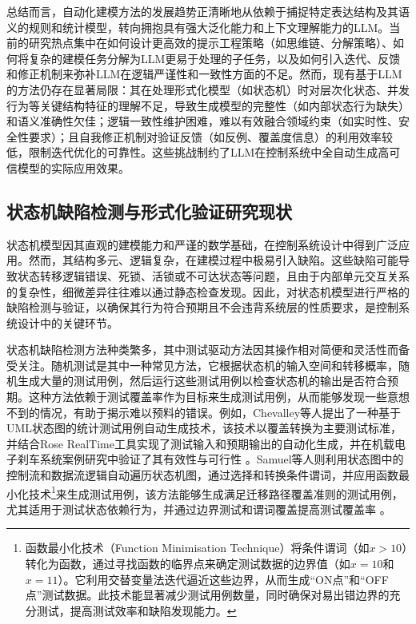 总结而言，自动化建模方法的发展趋势正清晰地从依赖于捕捉特定表达结构及其语义的规则和统计模型，转向拥抱具有强大泛化能力和上下文理解能力的LLM。当前的研究热点集中在如何设计更高效的提示工程策略（如思维链、分解策略）、如何将复杂的建模任务分解为LLM更易于处理的子任务，以及如何引入迭代、反馈和修正机制来弥补LLM在逻辑严谨性和一致性方面的不足。然而，现有基于LLM的方法仍存在显著局限：其在处理形式化模型（如状态机）时对层次化状态、并发行为等关键结构特征的理解不足，导致生成模型的完整性（如内部状态行为缺失）和语义准确性欠佳；逻辑一致性维护困难，难以有效融合领域约束（如实时性、安全性要求）；且自我修正机制对验证反馈（如反例、覆盖度信息）的利用效率较低，限制迭代优化的可靠性。这些挑战制约了LLM在控制系统中全自动生成高可信模型的实际应用效果。




\subsection{状态机缺陷检测与形式化验证研究现状}

状态机模型因其直观的建模能力和严谨的数学基础，在控制系统设计中得到广泛应用。然而，其结构多元、逻辑复杂，在建模过程中极易引入缺陷。这些缺陷可能导致状态转移逻辑错误、死锁、活锁或不可达状态等问题，且由于内部单元交互关系的复杂性，细微差异往往难以通过静态检查发现。因此，对状态机模型进行严格的缺陷检测与验证，以确保其行为符合预期且不会违背系统层的性质要求，是控制系统设计中的关键环节。

状态机缺陷检测方法种类繁多，其中测试驱动方法因其操作相对简便和灵活性而备受关注。随机测试是其中一种常见方法，它根据状态机的输入空间和转移概率，随机生成大量的测试用例，然后运行这些测试用例以检查状态机的输出是否符合预期。这种方法依赖于测试覆盖率作为目标来生成测试用例，从而能够发现一些意想不到的情况，有助于揭示难以预料的错误。例如，Chevalley等人提出了一种基于UML状态图的统计测试用例自动生成技术，该技术以覆盖转换为主要测试标准，并结合Rose RealTime工具实现了测试输入和预期输出的自动化生成，并在机载电子刹车系统案例研究中验证了其有效性与可行性 。Samuel等人则利用状态图中的控制流和数据流逻辑自动遍历状态机图，通过选择和转换条件谓词，并应用函数最小化技术\footnote{函数最小化技术（Function Minimisation Technique）将条件谓词（如$x > 10$）转化为函数，通过寻找函数的临界点来确定测试数据的边界值（如$x=10$和$x=11$）。它利用交替变量法迭代逼近这些边界，从而生成“ON点”和“OFF点”测试数据。此技术能显著减少测试用例数量，同时确保对易出错边界的充分测试，提高测试效率和缺陷发现能力。}来生成测试用例，该方法能够生成满足迁移路径覆盖准则的测试用例，尤其适用于测试状态依赖行为，并通过边界测试和谓词覆盖提高测试覆盖率 。

